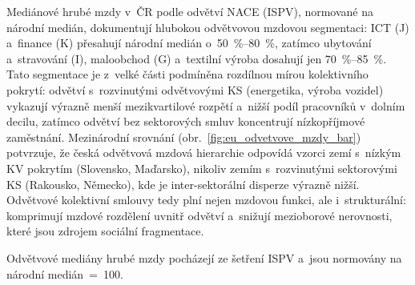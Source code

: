 Mediánové hrubé mzdy v~ČR podle odvětví \ac{NACE} (\ac{ISPV}), normované na národní medián, dokumentují hlubokou odvětvovou mzdovou segmentaci: ICT (J) a~finance (K) přesahují národní medián o~\SIrange{50}{80}{\percent}, zatímco ubytování a~stravování (I), maloobchod (G) a~textilní výroba dosahují jen \SIrange{70}{85}{\percent}.
Tato segmentace je z~velké části podmíněna rozdílnou mírou kolektivního pokrytí: odvětví s~rozvinutými odvětvovými \ac{KS} (energetika, výroba vozidel) vykazují výrazně menší mezikvartilové rozpětí a~nižší podíl pracovníků v~dolním decilu, zatímco odvětví bez sektorových smluv koncentrují nízkopříjmové zaměstnání.
Mezinárodní srovnání (obr.~\ref{fig:eu_odvetvove_mzdy_bar}) potvrzuje, že česká odvětvová mzdová hierarchie odpovídá vzorci zemí s~nízkým \ac{KV} pokrytím (Slovensko, Maďarsko), nikoliv zemím s~rozvinutými sektorovými \ac{KS} (Rakousko, Německo), kde je inter-sektorální disperze výrazně nižší.
Odvětvové kolektivní smlouvy tedy plní nejen mzdovou funkci, ale i~strukturální: komprimují mzdové rozdělení uvnitř odvětví a~snižují mezioborové nerovnosti, které jsou zdrojem sociální fragmentace.

Odvětvové mediány hrubé mzdy pocházejí ze šetření \acs{ISPV} a~jsou normovány na národní medián~=~100.\par



